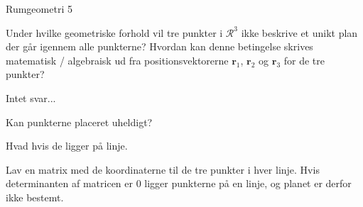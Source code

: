 \documentclass{article}
\begin{document}
\begin{exercise}{Rumgeometri 5}

Under hvilke geometriske forhold vil tre punkter i 
$\mathcal{R}^3$ ikke beskrive et unikt plan der går igennem
alle punkterne?
Hvordan kan denne betingelse skrives matematisk / algebraisk
ud fra positionsvektorerne $\mathbf{r}_1$, $\mathbf{r}_2$ og
$\mathbf{r}_3$ for de tre punkter?

Intet svar...

\hint
Kan punkterne placeret uheldigt?

\hint
Hvad hvis de ligger på linje.

\hint
Lav en matrix med de koordinaterne til de tre punkter
i hver linje.
Hvis determinanten af matricen er 0 ligger punkterne på en linje, 
og planet er derfor ikke bestemt.

\end{exercise}
\end{document}
